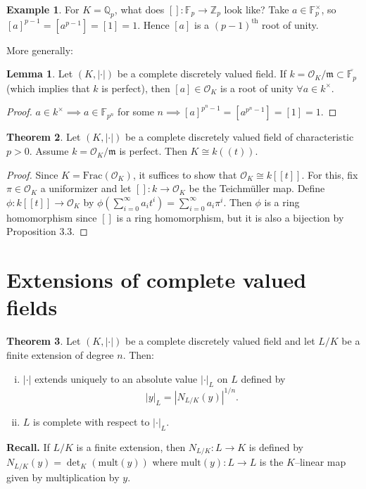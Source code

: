 \documentclass{article}
\theoremstyle{definition}
\newtheorem{theorem}{Theorem}[section]
\newtheorem{lemma}[theorem]{Lemma}
\newtheorem{example}{Example}[section]
\begin{document}
\begin{example}
    For $K=\mathbb{Q}_p$, what does $[]: \mathbb{F}_p \to \mathbb{Z}_p$ look like? Take $a \in \mathbb{F}_p^\times$, so $[a]^{p-1}=[a^{p-1}] = [1] = 1$. Hence $[a]$ is a $(p-1)^{\text{th}}$ root of unity.
\end{example}
More generally:
\begin{lemma}
    Let $(K,|\cdot|)$ be a complete discretely valued field. If $k = \mathcal{O}_K/\mathfrak{m} \subset \overline{\mathbb{F}_p}$ (which implies that $k$ is perfect), then $[a] \in \mathcal{O}_K$ is a root of unity $\forall a \in k^\times$.
\end{lemma}
\begin{proof}
    $a \in k^\times \implies a \in \mathbb{F}_{p^n}$ for some $n \implies [a]^{p^n-1}=[a^{p^n-1}] = [1] = 1$.
\end{proof}
\begin{theorem}
    Let $(K, |\cdot|)$ be a complete discretely valued field of characteristic $p > 0$. Assume $k = \mathcal{O}_K/\mathfrak{m}$ is perfect. Then $K \cong k((t))$.
\end{theorem}
\begin{proof}
    Since $K = \text{Frac}(\mathcal{O}_K)$, it suffices to show that $\mathcal{O}_K \cong k[[t]]$. For this, fix $\pi \in \mathcal{O}_K$ a uniformizer and let $[]: k \to \mathcal{O}_K$ be the Teichmüller map. Define $\phi : k[[t]] \to \mathcal{O}_K$ by $\phi\left(\sum_{i=0}^{\infty} a_i t^i \right) = \sum_{i=0}^{\infty} a_i \pi^i$. Then $\phi$ is a ring homomorphism since $[]$ is a ring homomorphism, but it is also a bijection by Proposition 3.3.
\end{proof}

\section{Extensions of complete valued fields}


\begin{theorem}\label{theorem6.1}
    Let $(K,|\cdot|)$ be a complete discretely valued field and let $L/K$ be a finite extension of degree $n$. Then:
    \begin{enumerate}[(i)]
        \item $|\cdot|$ extends uniquely to an absolute value $|\cdot|_L$ on $L$ defined by $$|y|_L = |N_{L/K}(y)|^{1/n}.$$
        \item $L$ is complete with respect to $|\cdot|_L$.
    \end{enumerate}
\end{theorem}
\textbf{Recall.} If $L/K$ is a finite extension, then $N_{L/K}: L \to K$ is defined by $N_{L/K}(y) = \det_K(\text{mult}(y))$ where $\text{mult}(y): L \to L$ is the $K$--linear map given by multiplication by $y$.
\vspace{1mm}
 
\end{document}
